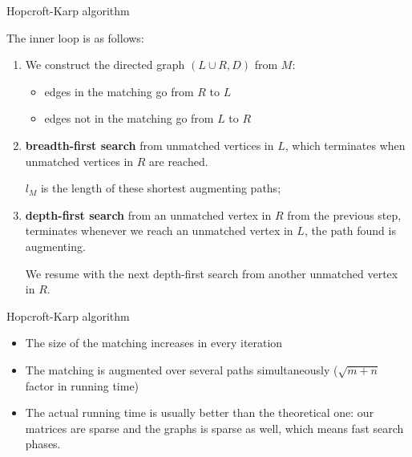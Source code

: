 \begin{frame}{Hopcroft-Karp algorithm}

	The inner loop is as follows:

	\begin{enumerate}
\item We construct the directed graph $(L \cup R, D)$ from $M$:
\begin{itemize}
	\item edges in the matching go from $R$ to $L$
	\item edges not in the matching go from $L$ to $R$
\end{itemize}
\item \textbf{breadth-first search} from unmatched vertices in $L$, which terminates when unmatched vertices in $R$ are reached. 

	$l_M$ is the length of these shortest augmenting paths;
\item \textbf{depth-first search} from an unmatched vertex in $R$ from the previous step, terminates whenever we reach an unmatched vertex in $L$, the path found is augmenting. 
	
We resume with the next depth-first search from another unmatched vertex in $R$.
\end{enumerate}
\end{frame}

\begin{frame}{Hopcroft-Karp algorithm}
\begin{itemize}\itemsep=0.4cm
		\item The size of the matching increases in every iteration
		\item The matching is augmented over several paths simultaneously ($\sqrt{m+n}$ factor in running time)
		\item The actual running time is usually better than the theoretical one: our matrices are sparse and the graphs is sparse as well, which means fast search phases.
	\end{itemize}
\end{frame}

